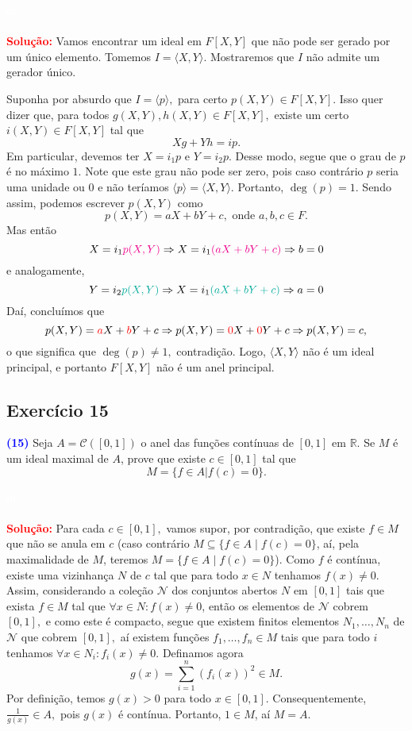 \documentclass[11pt,a4paper]{article}
\newcommand{\exercicio}[1]{\subsection{Exercício #1} \textcolor{blue}{\bf(#1)}}
\newcommand{\solucao}[1]{
\textbf{\textcolor{white}{oi}\\ \\ \textcolor{red}{Solução:}} #1}
\begin{document}
\solucao{Vamos encontrar um ideal em $F[X, Y]$ que não pode ser gerado por um único elemento. Tomemos $I = \langle X, Y \rangle.$ Mostraremos que $I$ não admite um gerador único.

Suponha por absurdo que $I = \langle p \rangle,$ para certo $p(X,Y) \in F[X,Y].$ Isso quer dizer que, para todos $g(X,Y), h(X,Y) \in F[X,Y],$ existe um certo $i(X,Y) \in F[X,Y]$ tal que
\[
Xg + Yh = ip.
\]
Em particular, devemos ter $X = i_1p$ e $Y = i_2p.$ Desse modo, segue que o grau de $p$ é no máximo $1.$ Note que este grau não pode ser zero, pois caso contrário $p$ seria uma unidade ou $0$ e não teríamos $\langle p \rangle = \langle X,Y \rangle.$ Portanto, $\deg(p) = 1.$ Sendo assim, podemos escrever $p(X,Y)$ como
\[
p(X,Y) = aX + bY + c, \mbox{ onde } a,b,c \in F.
\]
Mas então
\[
X = i_1\textcolor{Magenta}{p(X,Y)} \Rightarrow X = i_1\textcolor{Magenta}{(aX + bY + c)} \Rightarrow b = 0
\]
e analogamente, 
\[
Y = i_2\textcolor{JungleGreen}{p(X,Y)} \Rightarrow X = i_1\textcolor{JungleGreen}{(aX + bY + c)} \Rightarrow a = 0
\]
Daí, concluímos que
\[
p(X,Y) = \textcolor{red}{a}X +  \textcolor{red}{b}Y + c \Rightarrow p(X,Y) = \textcolor{red}{0}X +  \textcolor{red}{0}Y + c \Rightarrow p(X,Y) = c,
\]
o que significa que $\deg(p) \neq 1,$ contradição.
Logo, $\langle X, Y \rangle$ não é um ideal principal, e portanto $F[X,Y]$ não é um anel principal.
}
\exercicio{15} Seja $A = \mathcal{C}([0, 1])$ o anel das funções contínuas de $[0, 1]$ em $\mathbb{R}.$ Se $M$ é um ideal maximal de $A$, prove que existe $c \in [0, 1]$ tal que \[M = \{f \in A | f(c) = 0\}.\]
\solucao{%
Para cada $c \in [0,1],$ vamos supor, por contradição, que existe $f \in M$ que não se anula em $c$ (caso contrário $M \subseteq \{f \in A \mid f(c) = 0\}$, aí, pela maximalidade de $M$, teremos $M = \{f \in A \mid f(c) = 0\}$). Como $f$ é contínua, existe uma vizinhança $N$ de $c$ tal que para todo $x\in N$ tenhamos $f(x) \neq 0.$ Assim, considerando a coleção $\mathcal{N}$ dos conjuntos abertos $N$ em $[0,1]$ tais que exista $f\in M$ tal que $\forall x\in N:f(x)\neq 0$, então os elementos de $\mathcal{N}$ cobrem $[0,1],$ e como este é compacto, segue que existem finitos elementos $N_1, \ldots, N_n$ de $\mathcal{N}$ que cobrem $[0,1],$ aí existem funções $f_1,\dots,f_n\in M$ tais que para todo $i$ tenhamos $\forall x\in N_i:f_i(x)\neq 0$. Definamos agora
\[
g(x) = \sum\limits_{i=1}^n (f_i(x))^2 \in M.
\]
Por definição, temos $g(x) > 0$ para todo $x \in [0,1].$ Consequentemente, $\frac{1}{g(x)} \in A,$ pois $g(x)$ é contínua. Portanto, $1 \in M$, aí $M = A.$  
}
\end{document}
